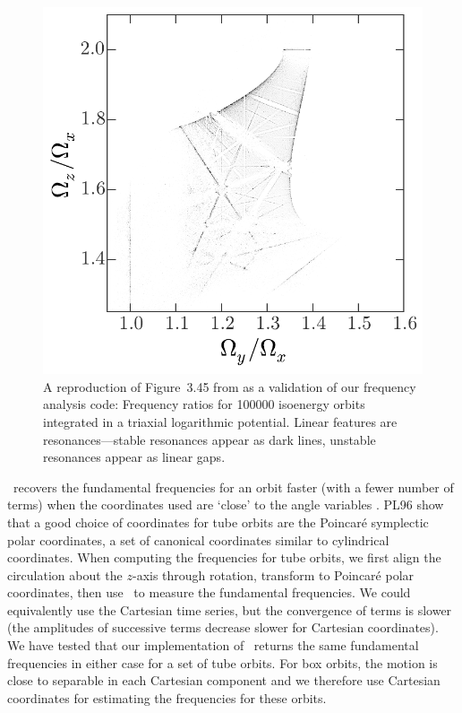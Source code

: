 \setcounter{figure}{0}
\begin{figure}
\begin{center}
\includegraphics[width=\textwidth]{figures/ch3/log-freqmap.pdf}
\caption{ A reproduction of Figure~3.45 from \citep{binneytremaine} as a
validation of our frequency analysis code: Frequency ratios for 100000 isoenergy
orbits integrated in a triaxial logarithmic potential. Linear features are
resonances---stable resonances appear as dark lines, unstable resonances appear
as linear gaps.} \label{fig:logfreqs}
\end{center}
\end{figure}

\superfreq\ recovers the fundamental frequencies for an orbit faster (with a
fewer number of terms) when the coordinates used are `close' to the angle
variables \cite[PL96;][]{papaphilippou96}. PL96 show that a good choice of
coordinates for tube orbits are the Poincar\'e symplectic polar coordinates, a
set of canonical coordinates similar to cylindrical coordinates. When computing
the frequencies for tube orbits, we first align the circulation about the
$z$-axis through rotation, transform to Poincar\'e polar coordinates, then use
\superfreq\ to measure the fundamental frequencies. We could equivalently use
the Cartesian time series, but the convergence of terms is slower (the
amplitudes of successive terms decrease slower for Cartesian coordinates). We
have tested that our implementation of \superfreq\ returns the same fundamental
frequencies in either case for a set of tube orbits. For box orbits, the motion
is close to separable in each Cartesian component and we therefore use Cartesian
coordinates for estimating the frequencies for these orbits.

